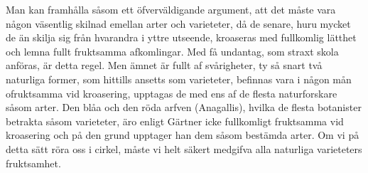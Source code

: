 Man kan framhålla såsom ett öfverväldigande argument, att det måste vara någon väsentlig skilnad emellan arter och varieteter, då de senare, huru mycket de än skilja sig från hvarandra i yttre utseende, kroaseras med fullkomlig lätthet och lemna fullt fruktsamma afkomlingar. Med få undantag, som straxt skola anföras, är detta regel. Men ämnet är fullt af svårigheter, ty så snart två naturliga former, som hittills ansetts som varieteter, befinnas vara i någon mån ofruktsamma vid kroasering, upptagas de med ens af de flesta naturforskare såsom arter. Den blåa och den röda arfven (Anagallis), hvilka de flesta botanister betrakta såsom varieteter, äro enligt Gärtner icke fullkomligt fruktsamma vid kroasering och på den grund upptager han dem såsom bestämda arter. Om vi på detta sätt röra oss i cirkel, måste vi helt säkert medgifva alla naturliga varieteters fruktsamhet.

